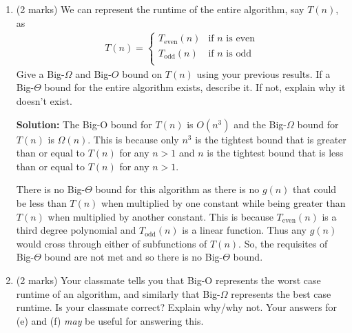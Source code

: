 \documentclass[a4,13pt]{extarticle}
\newenvironment{Solution}{\color{blue}\textbf{Solution:}}{}
\begin{document}
\begin{enumerate}
\begin{enumerate}
\begin{Solution}
				Conversely, the worst case must be for the even case or when the running time is $2n^3$. The Big-$\Theta$ for this case is $O(n^3)$.

				Both of these bounds have been proven in previous sections.
			\end{Solution}
			  
			\medskip     	      	      	      
	      	      	      	                  
	      	\item (2 marks) We can represent the runtime of the entire algorithm, say $T(n)$, as
	      	      \begin{align*}
	      	      	T(n)=\begin{cases}
	      	      	T_{\text{even}}(n) & \text{if $n$ is even} \\
	      	      	T_{\text{odd}}(n)  & \text{if $n$ is odd}  \\
	      	      	\end{cases}
	      	      \end{align*}
	      	      Give a Big-$\Omega$ and Big-$O$ bound on $T(n)$ using your previous results. If a Big-$\Theta$ bound for the entire algorithm exists, describe it. If not, explain why it doesn’t exist.
	      	      
			\begin{Solution}
				The Big-O bound for $T(n)$ is $O(n^3)$ and the Big-$\Omega$ bound for $T(n)$ is $\Omega(n)$. This is because only $n^3$ is the tightest bound that is greater than or equal to $T(n)$ for any $n > 1$ and $n$ is the tightest bound that is less than or equal to $T(n)$ for any $n > 1$.

				\medskip

				There is no Big-$\Theta$ bound for this algorithm as there is no $g(n)$ that could be less than $T(n)$ when multiplied by one constant while being greater than $T(n)$ when multiplied by another constant. This is because $T_{\text{even}}(n)$ is a third degree polynomial and $T_{\text{odd}}(n)$ is a linear function. Thus any $g(n)$ would cross through either of subfunctions of $T(n)$. So, the requisites of Big-$\Theta$ bound are not met and so there is no Big-$\Theta$ bound.
	      	\end{Solution}
						   
			\medskip

	      	\item (2 marks) Your classmate tells you that Big-O represents the worst case runtime of an algorithm, and similarly that Big-$\Omega$ represents the best case runtime. Is your classmate correct? Explain why/why not. Your answers for (e) and (f) \textit{may} be useful for answering this.
	      	      

\end{enumerate}
\end{enumerate}
\end{document}
